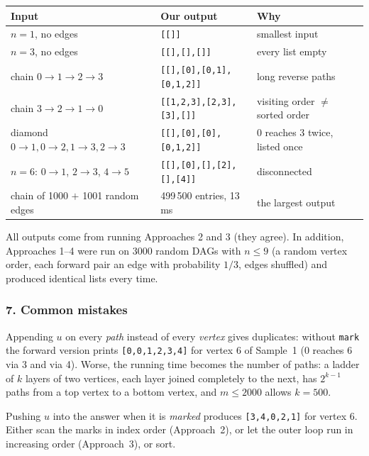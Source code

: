 \begin{testbox}
\centering\small
\begin{tabular}{@{}p{5.2cm}p{4.2cm}p{4.4cm}@{}}
\toprule
\textbf{Input} & \textbf{Our output} & \textbf{Why} \\
\midrule
$n = 1$, no edges & \texttt{[[]]} & smallest input \\
$n = 3$, no edges & \texttt{[[],[],[]]} & every list empty \\
chain $0 \to 1 \to 2 \to 3$ & \texttt{[[],[0],[0,1],[0,1,2]]} & long reverse paths \\
chain $3 \to 2 \to 1 \to 0$ & \texttt{[[1,2,3],[2,3],[3],[]]} & visiting order $\ne$ sorted order \\
diamond $0{\to}1, 0{\to}2, 1{\to}3, 2{\to}3$ & \texttt{[[],[0],[0],[0,1,2]]} & 0 reaches 3 twice, listed once \\
$n = 6$: $0{\to}1$, $2{\to}3$, $4{\to}5$ & \texttt{[[],[0],[],[2],[],[4]]} & disconnected \\
chain of 1000 $+$ 1001 random edges & 499\,500 entries, 13\,ms & the largest output \\
\bottomrule
\end{tabular}
\end{testbox}
All outputs come from running Approaches 2 and 3 (they agree). In addition, Approaches 1--4 were run on 3000 random DAGs with $n \le 9$ (a random vertex order, each forward pair an edge with probability $1/3$, edges shuffled) and produced identical lists every time.

\subsubsection*{7. Common mistakes}

\begin{warningbox}
Appending $u$ on every \emph{path} instead of every \emph{vertex} gives duplicates: without \texttt{mark} the forward version prints \texttt{[0,0,1,2,3,4]} for vertex 6 of Sample~1 (0 reaches 6 via 3 and via 4). Worse, the running time becomes the number of paths: a ladder of $k$ layers of two vertices, each layer joined completely to the next, has $2^{k-1}$ paths from a top vertex to a bottom vertex, and $m \le 2000$ allows $k = 500$.
\end{warningbox}

\begin{warningbox}
Pushing $u$ into the answer when it is \emph{marked} produces \texttt{[3,4,0,2,1]} for vertex 6. Either scan the marks in index order (Approach~2), or let the outer loop run in increasing order (Approach~3), or sort.
\end{warningbox}

